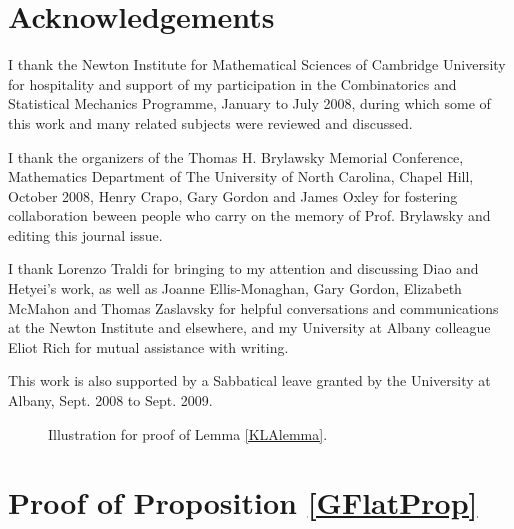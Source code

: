\documentclass[12pt,leqno]{amsart}
\theoremstyle{remark}
\begin{document}
\section{Acknowledgements}

I thank
the Newton Institute for Mathematical Sciences
of Cambridge University for hospitality and support of my
participation in the Combinatorics and Statistical Mechanics
Programme, January to July 2008, during which some of this
work and many related subjects were reviewed and discussed.

I thank the organizers of 
the Thomas H. Brylawsky Memorial Conference, Mathematics Department of
The University of North Carolina, Chapel Hill, October 2008, 
Henry Crapo, Gary Gordon and James Oxley
for
fostering collaboration beween people who carry
on the memory of Prof. Brylawsky and editing this journal
issue.  

I thank Lorenzo Traldi for bringing to my attention and
discussing Diao and Hetyei's work, as well as
Joanne Ellis-Monaghan, Gary Gordon, Elizabeth McMahon
and Thomas Zaslavsky for helpful conversations and communications
at the Newton Institute and elsewhere, and
my University at Albany colleague Eliot Rich for mutual assistance with
writing.

This work is also supported by a Sabbatical leave granted
by the University at Albany, Sept. 2008 to Sept. 2009.






\appendix

\begin{figure}

\caption{\label{Venn} Illustration for proof of Lemma \ref{KLAlemma}.}
\end{figure}



\section{Proof of Proposition \ref{GFlatProp}}
\end{document}
